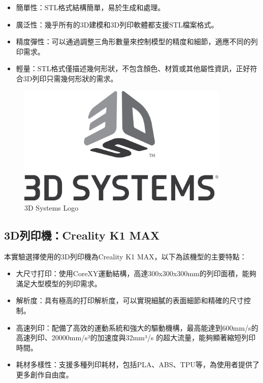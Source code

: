 \documentclass[class=NCU_thesis, crop=false]{standalone}
\begin{document}
\begin{itemize}
    \item 簡單性：STL格式結構簡單，易於生成和處理。
    \item 廣泛性：幾乎所有的3D建模和3D列印軟體都支援STL檔案格式。
    \item 精度彈性：可以通過調整三角形數量來控制模型的精度和細節，適應不同的列印需求。
    \item 輕量：STL格式僅描述幾何形狀，不包含顏色、材質或其他屬性資訊，正好符合3D列印只需幾何形狀的需求。
\end{itemize}

\begin{figure}[htbp]
    \centering
    \includegraphics[width=0.9\textwidth]{figures/3D_Systems_Logo.png}
\caption{3D Systems Logo}
\end{figure}

\subsection{3D列印機：Creality K1 MAX}
本實驗選擇使用的3D列印機為Creality K1 MAX，以下為該機型的主要特點：
\begin{itemize}
    \item 大尺寸打印：使用CoreXY運動結構，高達300x300x300mm的列印面積，能夠滿足大型模型的列印需求。
    \item 解析度：具有極高的打印解析度，可以實現細膩的表面細節和精確的尺寸控制。
    \item 高速列印：配備了高效的運動系統和強大的驅動機構，最高能達到600mm/s的高速列印、20000mm/s²的加速度與32mm³/s 的超大流量，能夠顯著縮短列印時間。
    \item 耗材多樣性：支援多種列印耗材，包括PLA、ABS、TPU等，為使用者提供了更多創作自由度。
\end{itemize}
\end{document}
